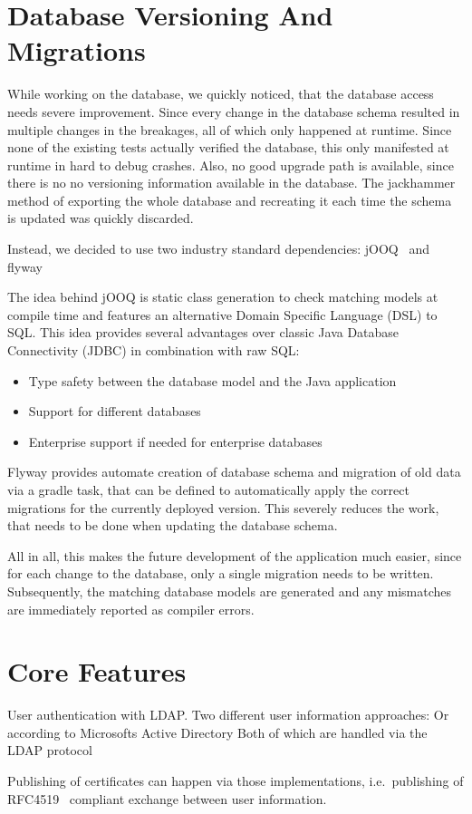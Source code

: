 \section{Database Versioning And Migrations}\label{sec:databaseVersioningAndMigrations}
While working on the database, we quickly noticed, that the database access needs severe improvement.
Since every change in the database schema resulted in multiple changes in the breakages, all of which only happened at
runtime.
Since none of the existing tests actually verified the database, this only manifested at runtime in hard to debug
crashes.
Also, no good upgrade path is available, since there is no no versioning information available in the database.
The jackhammer method of exporting the whole database and recreating it each time the schema is updated was quickly
discarded.

Instead, we decided to use two industry standard dependencies: jOOQ~\cite{jooq} and flyway~\cite{flyway}

The idea behind jOOQ is static class generation to check matching models at compile time and features an alternative
Domain Specific Language (DSL) to SQL\@.
This idea provides several advantages over classic Java Database Connectivity (JDBC) in combination with raw SQL:
\begin{itemize}
    \item Type safety between the database model and the Java application
    \item Support for different databases
    \item Enterprise support if needed for enterprise databases
\end{itemize}

Flyway provides automate creation of database schema and migration of old data via a gradle task, that can be defined to
automatically apply the correct migrations for the currently deployed version.
This severely reduces the work, that needs to be done when updating the database schema.

All in all, this makes the future development of the application much easier, since for each change to the database,
only a single migration needs to be written.
Subsequently, the matching database models are generated and any mismatches are immediately reported as compiler errors.

\section{Core Features}\label{sec:coreFeatures}
User authentication with LDAP.
Two different user information approaches:
Or according to Microsofts Active Directory
Both of which are handled via the LDAP protocol

Publishing of certificates can happen via those implementations, i.e.\ publishing of RFC4519~\cite{RFC} compliant exchange between
user information.
